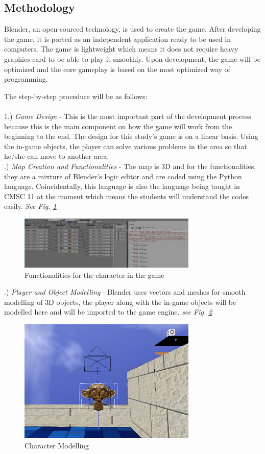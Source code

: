 \documentclass[journal]{./IEEE/IEEEtran}
\begin{document}
\begin{justify}
\section{\textbf{Methodology}}
Blender, an open-sourced technology, is used to create the game. \cite{blender} After developing the game, it is ported as an independent application ready to be used in computers. The game is lightweight which means it does not require heavy graphics card to be able to play it smoothly. Upon development, the game will be optimized and the core gameplay is based on the most optimized way of programming.

The step-by-step procedure will be as follows:\\
\\
1.)	\textit{Game Design} - This is the most important part of the development process because this is the main component on how the game will work from the beginning to the end. The design for this study's game is on a linear basis. Using the in-game objects, the player can solve various problems in the area so that he/she can move to another area. 
\\
.)	\textit{Map Creation and Functionalities} - The map is 3D and for the functionalities, they are a mixture of Blender’s logic editor and are coded using the Python language. Coincidentally, this language is also the language being taught in CMSC 11 at the moment which means the students will understand the codes easily. \textit{See Fig. \ref{action}}\newline
\begin{figure}[ht]
   \includegraphics[width = 8.5cm]{images/actions}
   \caption{Functionalities for the character in the game}
   \label{action}
\end{figure}.)	\textit{Player and Object Modelling} - Blender uses vectors and meshes for smooth modelling of 3D objects, the player along with the in-game objects will be modelled here and will be imported to the game engine. \textit{see Fig. \ref{model}}\\
\begin{figure}[ht]
   \includegraphics[width = 8.5cm]{images/model}
   \caption{Character Modelling}
   \label{model}
\end{figure}


\end{justify}
\end{document}
